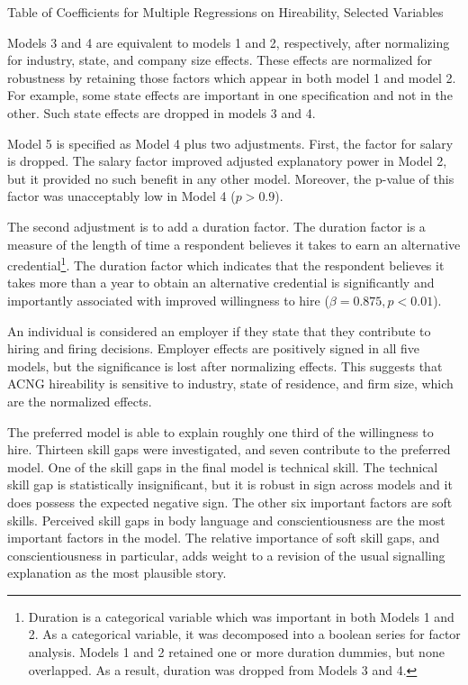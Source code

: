 \documentclass[review]{elsarticle}
\begin{document}
\begin{table}
    \caption{Table of Coefficients for Multiple Regressions on Hireability, Selected Variables}
    \resizebox{\columnwidth}{!}{
        
    }
    \label{tab:table_new_ols}
\end{table}

Models 3 and 4 are equivalent to models 1 and 2, respectively, after normalizing for industry, state, and company size effects.
These effects are normalized for robustness by retaining those factors which appear in both model 1 and model 2.
For example, some state effects are important in one specification and not in the other.
Such state effects are dropped in models 3 and 4.

Model 5 is specified as Model 4 plus two adjustments.
First, the factor for salary is dropped.
The salary factor improved adjusted explanatory power in Model 2, but it provided no such benefit in any other model.
Moreover, the p-value of this factor was unacceptably low in Model 4 ($p > 0.9$).

The second adjustment is to add a duration factor.
The duration factor is a measure of the length of time a respondent believes it takes to earn an alternative credential\footnote{
    Duration is a categorical variable which was important in both Models 1 and 2.
    As a categorical variable, it was decomposed into a boolean series for factor analysis.
    Models 1 and 2 retained one or more duration dummies, but none overlapped.
    As a result, duration was dropped from Models 3 and 4.
}.
The duration factor which indicates that the respondent believes it takes more than a year to obtain an alternative credential
is significantly and importantly associated with improved willingness to hire ($\beta = 0.875, p < 0.01$).

An individual is considered an employer if they state that they contribute to hiring and firing decisions.
Employer effects are positively signed in all five models, but the significance is lost after normalizing effects.
This suggests that ACNG hireability is sensitive to industry, state of residence, and firm size, which are the normalized effects.

The preferred model is able to explain roughly one third of the willingness to hire.
Thirteen skill gaps were investigated, and seven contribute to the preferred model.
One of the skill gaps in the final model is technical skill.
The technical skill gap is statistically insignificant, but it is robust in sign across models and it does possess the expected negative sign.
The other six important factors are soft skills.
Perceived skill gaps in body language and conscientiousness are the most important factors in the model.
The relative importance of soft skill gaps, and conscientiousness in particular, adds weight to a revision of the usual signalling explanation as the most plausible story.
\end{document}
